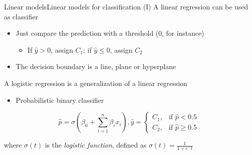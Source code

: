 \documentclass[10pt,compress]{beamer} %
\begin{document}
\begin{frame}{Linear models}{Linear models for classification (I)}
    A linear regression can be used as classifier
	\begin{itemize}
		\item Just compare the prediction with a threshold (0, for instance)
            \begin{itemize}
                \item If $\hat{y} > 0$, assign $C_1$; if $\hat{y} \le 0$, assign $C_2$
            \end{itemize}
        \item The decision boundary is a line, plane or hyperplane
	\end{itemize}

    A \alert{logistic regression} is a generalization of a linear regression
    \begin{itemize}
        \item Probabilistic binary classifier
    \end{itemize}

    \begin{fleqn}
    \begin{equation*}
        \hat{p} = \sigma\left(\beta_0+\sum_{i=1}^{n} \beta_i x_i\right),
        \hat{y} = \begin{cases}C_1, & \text{if } \hat{p} < 0.5 \\ C_2, & \text{if } \hat{p} \ge 0.5\end{cases} 
    \end{equation*}
    \end{fleqn}

    where $\sigma(t)$ is the \textit{logistic function}, defined as $\sigma(t) = \frac{1}{1 + e^-t}$

    \vspace{-3cm}
    \flushright
\end{frame}
\end{document}
